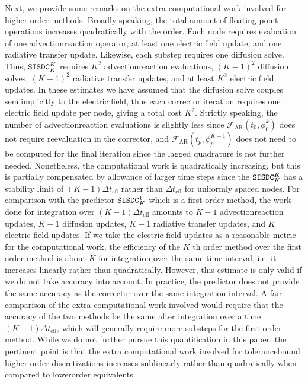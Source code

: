 \documentclass[letterpaper,10pt,english]{sphinxmanual}
\begin{document}
Next, we provide some remarks on the extra computational work involved for higher order methods. Broadly speaking, the total amount of floating point operations increases quadratically with the order. Each node requires evaluation of one advection\sphinxhyphen{}reaction operator, at least one electric field update, and one radiative transfer update. Likewise, each substep requires one diffusion solve. Thus, \(\verb|SISDC|_K^K\) requires \(K^2\) advection\sphinxhyphen{}reaction evaluations, \((K-1)^2\) diffusion solves, \((K-1)^2\) radiative transfer updates, and at least \(K^2\) electric field updates. In these estimates we have assumed that the diffusion solve couples semi\sphinxhyphen{}implicitly to the electric field, thus each corrector iteration requires one electric field update per node, giving a total cost \(K^2\). Strictly speaking, the number of advection\sphinxhyphen{}reaction evaluations is slightly less since \(\mathcal{F}_{\textrm{AR}}\left(t_0, \phi_0^k\right)\) does not require re\sphinxhyphen{}evaluation in the corrector, and \(\mathcal{F}_{\textrm{AR}}\left(t_p,\phi_p^{K-1}\right)\) does not need to be computed for the final iteration since the lagged quadrature is not further needed. Nonetheless, the computational work is quadratically increasing, but this is partially compensated by allowance of larger time steps since the \(\verb|SISDC|_K^K\) has a stability limit of \((K-1)\Delta t_{\textrm{cfl}}\) rather than \(\Delta t_{\textrm{cfl}}\) for uniformly spaced nodes. For comparison with the predictor \(\verb|SISDC|_K^1\) which is a first order method, the work done for integration over \((K-1)\Delta t_{\textrm{cfl}}\) amounts to \(K-1\) advection\sphinxhyphen{}reaction updates, \(K-1\) diffusion updates, \(K-1\) radiative transfer updates, and \(K\) electric field updates. If we take the electric field updates as a reasonable metric for the computational work, the efficiency of the \(K\) th order method over the first order method is about \(K\) for integration over the same time interval, i.e. it increases linearly rather than quadratically. However, this estimate is only valid if we do not take accuracy into account. In practice, the predictor does not provide the same accuracy as the corrector over the same integration interval. A fair comparison of the extra computational work involved would require that the accuracy of the two methods be the same after integration over a time \((K-1)\Delta t_{\textrm{cfl}}\), which will generally require more substeps for the first order method. While we do not further pursue this quantification in this paper, the pertinent point is that the extra computational work involved for tolerance\sphinxhyphen{}bound higher order discretizations increases sub\sphinxhyphen{}linearly rather than quadratically when compared to lower\sphinxhyphen{}order equivalents.
\end{document}
